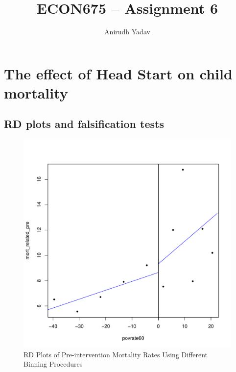 \documentclass[12pt]{article}
\title{ECON675 -- Assignment 6}
\author{Anirudh Yadav}
\begin{document}
\maketitle

\setcounter{tocdepth}{2}
\tableofcontents

\newpage

\section{The effect of Head Start on child mortality}

\subsection{RD plots and falsification tests}
\begin{figure}[htpb!]
    \centering
    \caption{RD Plots of Pre-intervention Mortality Rates Using Different Binning Procedures}
    \begin{minipage}{0.5\textwidth}
        \includegraphics[width=1\textwidth]{q2-1-es.pdf}
    \end{minipage}\hfill
    \begin{minipage}{0.5\textwidth}

\end{minipage}
\end{figure}
\end{document}
